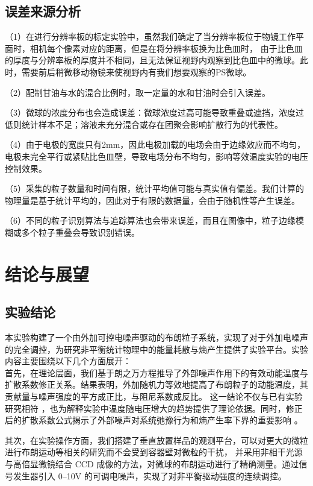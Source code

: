 \documentclass[a4paper]{report} %
\begin{document}
\section{误差来源分析}
（1）在进行分辨率板的标定实验中，虽然我们确定了当分辨率板位于物镜工作平面时，相机每个像素对应的距离，但是在将分辨率板换为比色皿时，
由于比色皿的厚度与分辨率板的厚度并不相同，且无法保证视野内观察到比色皿中的微球。此时，需要前后稍微移动物镜来使视野内有我们想要观察的PS微球。 \par
（2）配制甘油与水的混合比例时，取一定量的水和甘油时会引入误差。\par
（3）微球的浓度分布也会造成误差：微球浓度过高可能导致重叠或遮挡，浓度过低则统计样本不足；溶液未充分混合或存在团聚会影响扩散行为的代表性。\par
（4）由于电极的宽度只有2mm，因此电极加载的电场会由于边缘效应而不均匀，电极未完全平行或紧贴比色皿壁，导致电场分布不均匀，影响等效温度实验的电压控制效果。\par
（5）采集的粒子数量和时间有限，统计平均值可能与真实值有偏差。我们计算的物理量是基于统计平均的，因此对于有限的数据量，会由于随机性等产生误差。\par
（6）不同的粒子识别算法与追踪算法也会带来误差，而且在图像中，粒子边缘模糊或多个粒子重叠会导致识别错误。\par

\chapter{结论与展望}
\section{实验结论}
本实验构建了一个由外加可控电噪声驱动的布朗粒子系统，实现了对于外加电噪声的完全调控，为研究非平衡统计物理中的能量耗散与熵产生提供了实验平台。实验内容主要围绕以下几个方面展开：\\

首先，在理论层面，我们基于朗之万方程推导了外部噪声作用下的有效动能温度与扩散系数修正关系。结果表明，外加随机力等效地提高了布朗粒子的动能温度，其贡献量与噪声强度的平方成正比，与阻尼系数成反比。
这一结论不仅与已有实验研究相符 \cite{Martinez2013,Roldan2014}，也为解释实验中温度随电压增大的趋势提供了理论依据。同时，修正后的扩散系数公式揭示了外部噪声对系统弛豫行为和熵产生率下界的重要影响 \cite{Leighton2024}。\par

其次，在实验操作方面，我们搭建了垂直放置样品的观测平台，可以对更大的微粒进行布朗运动等相关的研究而不会受到容器壁对微粒的干扰，
并采用非相干光源与高倍显微镜结合 CCD 成像的方法，对微球的布朗运动进行了精确测量。通过信号发生器引入 0--10V 的可调电噪声，实现了对非平衡驱动强度的连续调控。\par
\end{document}
